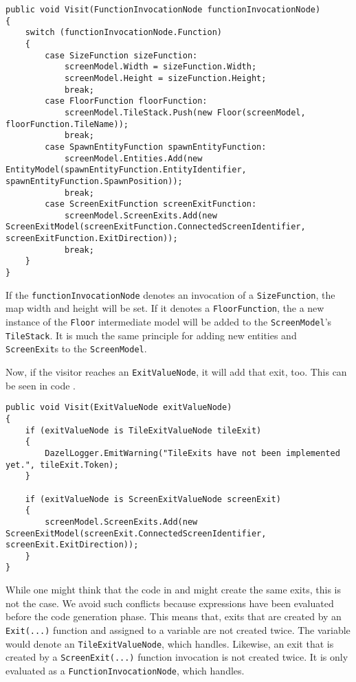 \begin{lstlisting}[language=CSharp, caption={FunctionInvocationNode Visit method}, label={lst:finVisitSG}]
public void Visit(FunctionInvocationNode functionInvocationNode)
{
    switch (functionInvocationNode.Function)
    {
        case SizeFunction sizeFunction:
            screenModel.Width = sizeFunction.Width;
            screenModel.Height = sizeFunction.Height;
            break;
        case FloorFunction floorFunction:
            screenModel.TileStack.Push(new Floor(screenModel, floorFunction.TileName));
            break;
        case SpawnEntityFunction spawnEntityFunction:
            screenModel.Entities.Add(new EntityModel(spawnEntityFunction.EntityIdentifier, spawnEntityFunction.SpawnPosition));
            break;
        case ScreenExitFunction screenExitFunction:
            screenModel.ScreenExits.Add(new ScreenExitModel(screenExitFunction.ConnectedScreenIdentifier, screenExitFunction.ExitDirection));
            break;
    }
}    
\end{lstlisting}

If the \texttt{functionInvocationNode} denotes an invocation of a \texttt{SizeFunction}, the map width and height will be set. If it denotes a \texttt{FloorFunction}, the a new instance of the \texttt{Floor} intermediate model will be added to the \texttt{ScreenModel}'s \texttt{TileStack}. It is much the same principle for adding new entities and \texttt{ScreenExit}s to the \texttt{ScreenModel}.

Now, if the visitor reaches an \texttt{ExitValueNode}, it will add that exit, too. This can be seen in code .

\begin{lstlisting}[label={lst:visitExitNodeSG}, caption={Visit \texttt{ExitValueNode}}, language=CSharp]
public void Visit(ExitValueNode exitValueNode)
{
    if (exitValueNode is TileExitValueNode tileExit)
    {
        DazelLogger.EmitWarning("TileExits have not been implemented yet.", tileExit.Token);
    }

    if (exitValueNode is ScreenExitValueNode screenExit)
    {
        screenModel.ScreenExits.Add(new ScreenExitModel(screenExit.ConnectedScreenIdentifier, screenExit.ExitDirection));
    }
}
\end{lstlisting}

While one might think that the code in  and  might create the same exits, this is not the case. We avoid such conflicts because expressions have been evaluated before the code generation phase. This means that, exits that are created by an \texttt{Exit(...)} function and assigned to a variable are not created twice. The variable would denote an \texttt{TileExitValueNode}, which  handles. Likewise, an exit that is created by a \texttt{ScreenExit(...)} function invocation is not created twice. It is only evaluated as a \texttt{FunctionInvocationNode}, which  handles.